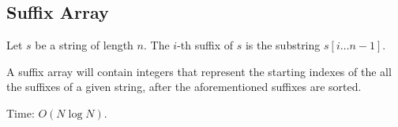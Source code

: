 \subsection{Suffix Array}

Let $s$ be a string of length $n$. The $i$-th suffix of $s$ is the substring $s[i \ldots n - 1]$.

A suffix array will contain integers that represent the starting indexes of the all the suffixes of a given string, after the aforementioned suffixes are sorted.

Time: $O(N \log N)$.
